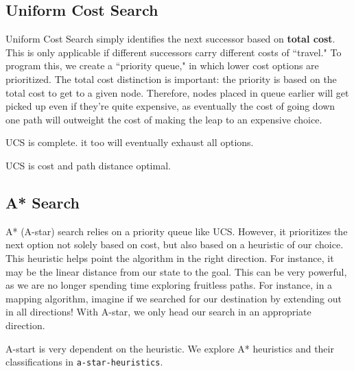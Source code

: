\documentclass[12pt]{article}
\begin{document}
\subsection*{Uniform Cost Search}

Uniform Cost Search simply identifies the next successor based on \textbf{total cost}. This is only applicable if different successors carry different costs of ``travel." To program this, we create a ``priority queue," in which lower cost options are prioritized. The total cost distinction is important: the priority is based on the total cost to get to a given node. Therefore, nodes placed in queue earlier will get picked up even if they're quite expensive, as eventually the cost of going down one path will outweight the cost of making the leap to an expensive choice.

UCS is complete. it too will eventually exhaust all options.

UCS is cost and path distance optimal.

\subsection*{A* Search}

A* (A-star) search relies on a priority queue like UCS. However, it prioritizes the next option not solely based on cost, but also based on a heuristic of our choice. This heuristic helps point the algorithm in the right direction. For instance, it may be the linear distance from our state to the goal. This can be very powerful, as we are no longer spending time exploring fruitless paths. For instance, in a mapping algorithm, imagine if we searched for our destination by extending out in all directions! With A-star, we only head our search in an appropriate direction.

A-start is very dependent on the heuristic. We explore A* heuristics and their classifications in \texttt{a-star-heuristics}.
\end{document}
